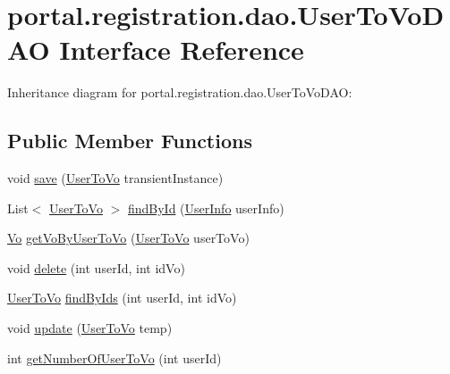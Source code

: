 \hypertarget{interfaceportal_1_1registration_1_1dao_1_1UserToVoDAO}{
\section{portal.registration.dao.UserToVoDAO Interface Reference}
\label{interfaceportal_1_1registration_1_1dao_1_1UserToVoDAO}
}


Inheritance diagram for portal.registration.dao.UserToVoDAO:
\subsection*{Public Member Functions}
\begin{DoxyCompactItemize}
\item 
void \hyperlink{interfaceportal_1_1registration_1_1dao_1_1UserToVoDAO_a1b64a9ef38ac754471c8fb0ff069e973}{save} (\hyperlink{classportal_1_1registration_1_1domain_1_1UserToVo}{UserToVo} transientInstance)
\item 
List$<$ \hyperlink{classportal_1_1registration_1_1domain_1_1UserToVo}{UserToVo} $>$ \hyperlink{interfaceportal_1_1registration_1_1dao_1_1UserToVoDAO_a69d40c38f99fa8e610a7706f01971458}{findById} (\hyperlink{classportal_1_1registration_1_1domain_1_1UserInfo}{UserInfo} userInfo)
\item 
\hyperlink{classportal_1_1registration_1_1domain_1_1Vo}{Vo} \hyperlink{interfaceportal_1_1registration_1_1dao_1_1UserToVoDAO_ab03d3abd18040c4fbee7a843115d8272}{getVoByUserToVo} (\hyperlink{classportal_1_1registration_1_1domain_1_1UserToVo}{UserToVo} userToVo)
\item 
void \hyperlink{interfaceportal_1_1registration_1_1dao_1_1UserToVoDAO_aad028aefe411d02e83c25089908a0123}{delete} (int userId, int idVo)
\item 
\hyperlink{classportal_1_1registration_1_1domain_1_1UserToVo}{UserToVo} \hyperlink{interfaceportal_1_1registration_1_1dao_1_1UserToVoDAO_aa50e9d0d19887dfd02c83ef3fb55211f}{findByIds} (int userId, int idVo)
\item 
void \hyperlink{interfaceportal_1_1registration_1_1dao_1_1UserToVoDAO_ae75b46fbc3679c3b5d48666ade7645a4}{update} (\hyperlink{classportal_1_1registration_1_1domain_1_1UserToVo}{UserToVo} temp)
\item 
int \hyperlink{interfaceportal_1_1registration_1_1dao_1_1UserToVoDAO_a95942d96eb73a286ed00cea23ea3785f}{getNumberOfUserToVo} (int userId)
\end{DoxyCompactItemize}


